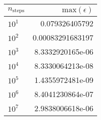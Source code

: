 \begin{tabular}{l|r}
\toprule
$n_{\mathrm{steps}}$ & $\mathrm{max}(\epsilon)$ \\
\midrule
              $10^1$ &           0.079326405792 \\
              $10^2$ &         0.00083291683197 \\
              $10^3$ &         8.3332920165e-06 \\
              $10^4$ &         8.3330064213e-08 \\
              $10^5$ &         1.4355972481e-09 \\
              $10^6$ &         8.4041230864e-07 \\
              $10^7$ &         2.9838006618e-06 \\
\bottomrule
\end{tabular}
